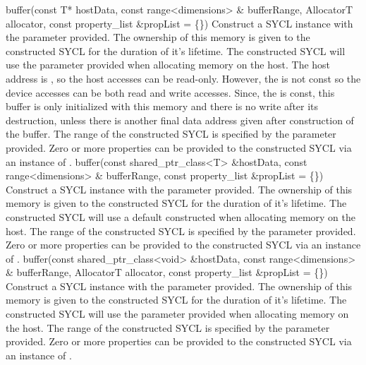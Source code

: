   \addRowFourSL
    {  buffer(const T* hostData, }
    {  const range<dimensions> \& bufferRange,}
    {  AllocatorT allocator, }
    {  const property_list \&propList = \{\}) }
    {
       Construct a SYCL  instance with the  parameter provided. The ownership of this memory is given to the constructed SYCL  for the duration of it's lifetime.
       The constructed SYCL  will use the  parameter provided when allocating memory on the host.       
      The host address is , so the host accesses can be read-only. However, the  is not const so the device accesses can be both read and write accesses. Since, the  is const, this buffer is only initialized with this memory and there is no write after its destruction, unless there is another final data address given after construction of the buffer.
        The range of the constructed SYCL  is specified by the  parameter provided.
       Zero or more properties can be provided to the constructed SYCL  via an instance of .
    }
  \addRowThreeSL
   { buffer(const shared_ptr_class<T> \&hostData,}
   { const range<dimensions> \& bufferRange, }
   { const property_list \&propList = \{\}) }
   {
       Construct a SYCL  instance with the  parameter provided. The ownership of this memory is given to the constructed SYCL  for the duration of it's lifetime.
       The constructed SYCL  will use a default constructed  when allocating memory on the host.
        The range of the constructed SYCL  is specified by the  parameter provided.
       Zero or more properties can be provided to the constructed SYCL  via an instance of .
    }
  \addRowFourSL
   { buffer(const shared_ptr_class<void> \&hostData,}
   { const range<dimensions> \& bufferRange, }
   { AllocatorT allocator, }
   { const property_list \&propList = \{\}) }
   {
       Construct a SYCL  instance with the  parameter provided. The ownership of this memory is given to the constructed SYCL  for the duration of it's lifetime.
       The constructed SYCL  will use the  parameter provided when allocating memory on the host.
        The range of the constructed SYCL  is specified by the  parameter provided.
       Zero or more properties can be provided to the constructed SYCL  via an instance of .
   }
